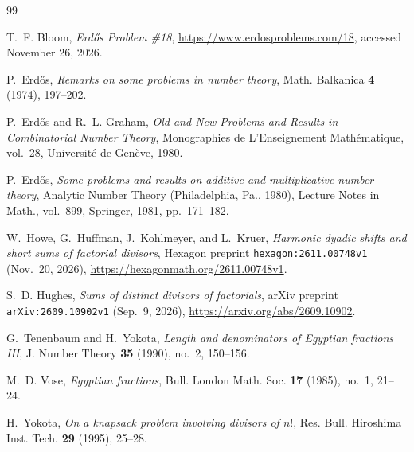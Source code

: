 \documentclass[11pt,a4paper]{amsart}
\theoremstyle{definition}
\theoremstyle{remark}
\begin{document}
\begin{thebibliography}{99}

T.~F. Bloom, \emph{Erd\H{o}s Problem \#18}, \url{https://www.erdosproblems.com/18}, accessed November 26, 2026.

P.~Erd\H{o}s, \emph{Remarks on some problems in number theory}, Math. Balkanica \textbf{4} (1974), 197--202.

P.~Erd\H{o}s and R.~L. Graham, \emph{Old and New Problems and Results in Combinatorial Number Theory}, Monographies de L'Enseignement Math\'ematique, vol.~28, Universit\'e de Gen\`eve, 1980.

P.~Erd\H{o}s, \emph{Some problems and results on additive and multiplicative number theory}, Analytic Number Theory (Philadelphia, Pa., 1980), Lecture Notes in Math., vol.~899, Springer, 1981, pp.~171--182.

W.~Howe, G.~Huffman, J.~Kohlmeyer, and L.~Kruer, \emph{Harmonic dyadic shifts and short sums of factorial divisors}, Hexagon preprint \texttt{hexagon:2611.00748v1} (Nov.~20, 2026), \url{https://hexagonmath.org/2611.00748v1}.

S.~D. Hughes, \emph{Sums of distinct divisors of factorials}, arXiv preprint \texttt{arXiv:2609.10902v1} (Sep.~9, 2026), \url{https://arxiv.org/abs/2609.10902}.

G.~Tenenbaum and H.~Yokota, \emph{Length and denominators of Egyptian fractions III}, J. Number Theory \textbf{35} (1990), no.~2, 150--156.

M.~D. Vose, \emph{Egyptian fractions}, Bull. London Math. Soc. \textbf{17} (1985), no.~1, 21--24.

H.~Yokota, \emph{On a knapsack problem involving divisors of $n!$}, Res. Bull. Hiroshima Inst. Tech. \textbf{29} (1995), 25--28.

\end{thebibliography}
\end{document}
